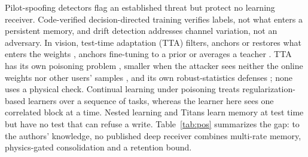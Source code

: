 \documentclass[journal]{IEEEtran}
\theoremstyle{remark}
\begin{document}
Pilot-spoofing detectors \cite{kapetanovic2013,tugnait2015} flag an established threat
\cite{zhou2012pilot,kapetanovic2015} but protect no learning receiver. Code-verified decision-directed
training \cite{viterbinet2020,schibisch2018} verifies labels, not what enters a persistent memory, and
drift detection \cite{uzlaner2024} addresses channel variation, not an adversary. In vision, test-time
adaptation (TTA) filters, anchors or restores what enters the weights \cite{eata2022,cotta2022,sar2023,rotta2023},
anchors fine-tuning to a prior \cite{l2sp2018,ewc2017} or
averages a teacher \cite{meanteacher2017}. TTA has its own poisoning
problem \cite{wu2023tta,cong2024}, smaller when the attacker sees neither the online weights nor other
users' samples \cite{su2025}, and its own robust-statistics defenses \cite{medbn}; none uses a physical
check. Continual learning under poisoning \cite{hu2026} treats regularization-based learners over
a sequence of tasks, whereas the learner here sees one correlated block at a time. Nested learning
\cite{behrouz2025nested} and Titans \cite{behrouz2025titans} learn memory at test time but have no test
that can refuse a write. Table~\ref{tab:pos} summarizes the gap: to the authors' knowledge, no
published deep receiver combines multi-rate memory, physics-gated consolidation and a retention bound.
\end{document}
